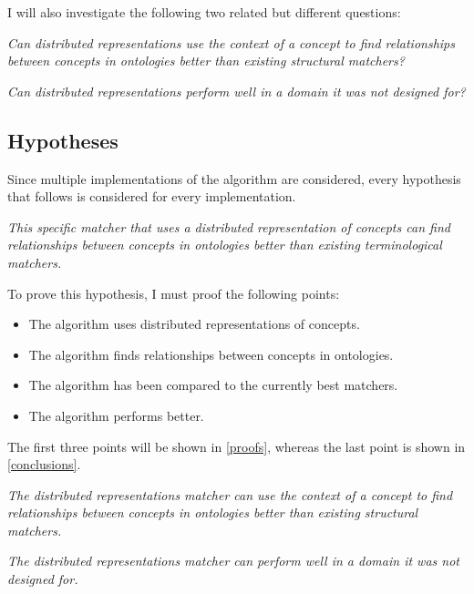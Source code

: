 \documentclass{article}
\begin{document}
 I will also investigate the following two related but different questions:
 
 \begin{center}
 \textit{
 Can distributed representations use the context of a concept to find relationships between concepts in ontologies better than existing structural matchers?
 }
 \end{center}
 
 \begin{center}
 \textit{
 Can distributed representations perform well in a domain it was not designed for?
 }
 \end{center}
 
 \subsection{Hypotheses}
 Since multiple implementations of the algorithm are considered, every hypothesis that follows is considered for every implementation.
 
 \begin{center}
 \textit{This specific matcher that uses a distributed representation of concepts can find relationships between concepts in ontologies better than existing terminological matchers.}
 \end{center}

 To prove this hypothesis, I must proof the following points:
 \begin{itemize}
 \item The algorithm uses distributed representations of concepts.
 \item The algorithm finds relationships between concepts in ontologies.
 \item The algorithm has been compared to the currently best matchers.
 \item The algorithm performs better.
 \end{itemize} 
 
 The first three points will be shown in \ref{proofs}, whereas the last point is shown in \ref{conclusions}.
 
 \begin{center} 
 \textit{The distributed representations matcher can use the context of a concept to find relationships between concepts in ontologies better than existing structural matchers.}
 \end{center}
 \begin{center}
 \textit{The distributed representations matcher can perform well in a domain it was not designed for.}
 \end{center}
 
\end{document}
